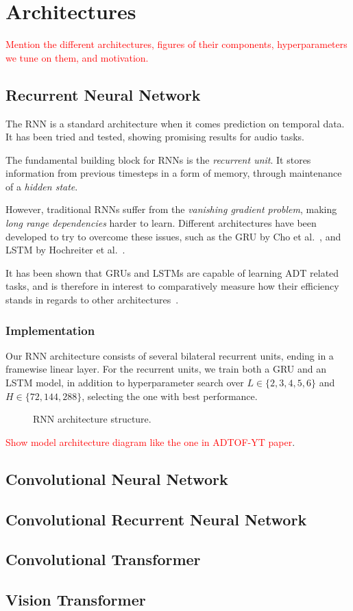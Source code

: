 \chapter{Architectures}

\textcolor{red}{Mention the different architectures, figures of their components, hyperparameters we tune on them, and motivation.}

\section{Recurrent Neural Network}

The \gls{RNN} is a standard architecture when it comes prediction on temporal data. It has been tried and tested, showing promising results for audio tasks.

The fundamental building block for \gls{RNN}s is the \textit{recurrent unit}. It stores information from previous timesteps in a form of memory, through maintenance of a \textit{hidden state}.

However, traditional \gls{RNN}s suffer from the \textit{vanishing gradient problem}, making \textit{long range dependencies} harder to learn. Different architectures have been developed to try to overcome these issues, such as the \gls{GRU} by Cho et al.~\cite{DBLP:conf/emnlp/ChoMGBBSB14}, and \gls{LSTM} by Hochreiter et al.~\cite{10.1162/neco.1997.9.8.1735}.

It has been shown that \gls{GRU}s and \gls{LSTM}s are capable of learning \gls{ADT} related tasks, and is therefore in interest to comparatively measure how their efficiency stands in regards to other architectures~\cite{Southall2016AutomaticDT, inproceedings, Vogl2017DrumTV, signals4040042}.

\subsection{Implementation}

Our \gls{RNN} architecture consists of several bilateral recurrent units, ending in a framewise linear layer. For the recurrent units, we train both a \gls{GRU} and an \gls{LSTM} model, in addition to hyperparameter search over $L \in \{2, 3, 4, 5, 6\}$ and $H \in \{72, 144, 288\}$, selecting the one with best performance.

\begin{figure}[H]
    \centering
    
    \caption{RNN architecture structure.}
    \label{RNNFigure}
\end{figure}

\textcolor{red}{Show model architecture diagram like the one in ADTOF-YT paper}.

\section{Convolutional Neural Network}

\section{Convolutional Recurrent Neural Network}

\section{Convolutional Transformer}

\section{Vision Transformer}
